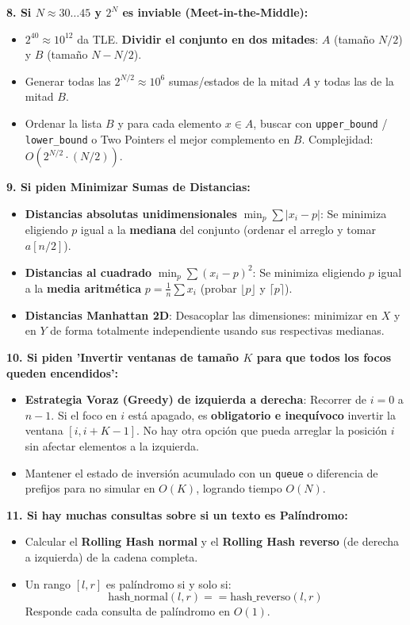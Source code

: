 \documentclass[9pt,twocolumn,a4paper]{extarticle}
\begin{document}
\textbf{8. Si $N \approx 30 \dots 45$ y $2^N$ es inviable (Meet-in-the-Middle):}
\begin{itemize}
    \setlength{\itemsep}{0pt}
    \item $2^{40} \approx 10^{12}$ da TLE. \textbf{Dividir el conjunto en dos mitades}: $A$ (tamaño $N/2$) y $B$ (tamaño $N - N/2$).
    \item Generar todas las $2^{N/2} \approx 10^6$ sumas/estados de la mitad $A$ y todas las de la mitad $B$.
    \item Ordenar la lista $B$ y para cada elemento $x \in A$, buscar con \texttt{upper\_bound} / \texttt{lower\_bound} o Two Pointers el mejor complemento en $B$. Complejidad: $O(2^{N/2} \cdot (N/2))$.
\end{itemize}

\textbf{9. Si piden Minimizar Sumas de Distancias:}
\begin{itemize}
    \setlength{\itemsep}{0pt}
    \item \textbf{Distancias absolutas unidimensionales} $\min_p \sum |x_i - p|$: Se minimiza eligiendo $p$ igual a la \textbf{mediana} del conjunto (ordenar el arreglo y tomar $a[n / 2]$).
    \item \textbf{Distancias al cuadrado} $\min_p \sum (x_i - p)^2$: Se minimiza eligiendo $p$ igual a la \textbf{media aritmética} $p = \frac{1}{n}\sum x_i$ (probar $\lfloor p \rfloor$ y $\lceil p \rceil$).
    \item \textbf{Distancias Manhattan 2D}: Desacoplar las dimensiones: minimizar en $X$ y en $Y$ de forma totalmente independiente usando sus respectivas medianas.
\end{itemize}

\textbf{10. Si piden 'Invertir ventanas de tamaño $K$ para que todos los focos queden encendidos':}
\begin{itemize}
    \setlength{\itemsep}{0pt}
    \item \textbf{Estrategia Voraz (Greedy) de izquierda a derecha}: Recorrer de $i = 0$ a $n - 1$. Si el foco en $i$ está apagado, es \textbf{obligatorio e inequívoco} invertir la ventana $[i, i + K - 1]$. No hay otra opción que pueda arreglar la posición $i$ sin afectar elementos a la izquierda.
    \item Mantener el estado de inversión acumulado con un \texttt{queue} o diferencia de prefijos para no simular en $O(K)$, logrando tiempo $O(N)$.
\end{itemize}

\textbf{11. Si hay muchas consultas sobre si un texto es Palíndromo:}
\begin{itemize}
    \setlength{\itemsep}{0pt}
    \item Calcular el \textbf{Rolling Hash normal} y el \textbf{Rolling Hash reverso} (de derecha a izquierda) de la cadena completa.
    \item Un rango $[l, r]$ es palíndromo si y solo si:
    $$\text{hash\_normal}(l, r) == \text{hash\_reverso}(l, r)$$
    Responde cada consulta de palíndromo en $O(1)$.
\end{itemize}
\end{document}
